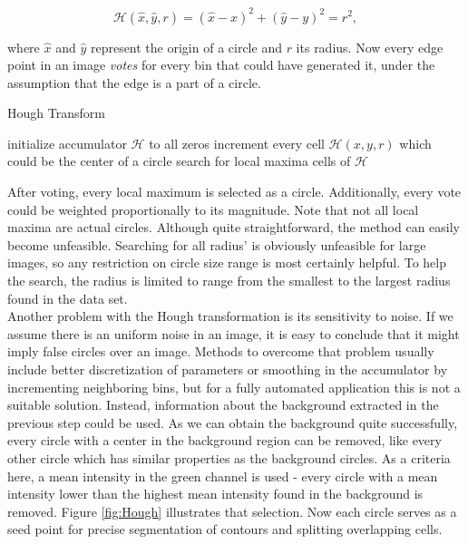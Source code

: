 \begin{equation}
	\mathcal{H}(\hat{x}, \hat{y}, r) = (\hat{x} - x)^2 + (\hat{y} - y)^2 = r^2,
\end{equation}

where  $\hat{x}$ and $\hat{y}$ represent the origin of a circle and $r$ its radius. Now every edge point in an image \textit{votes} for every bin that could have generated it, under the assumption that the edge is a part of a circle. \\

\begin{algorithm}
	\caption{Hough Transform}
 	\label{alg:Hough}
 	\begin{algorithmic}[1]
 		\State initialize accumulator $\mathcal{H}$ to all zeros
 			\State increment every cell $\mathcal{H}(x,y,r)$ which could be the center of a circle
 		\EndFor
 		\State search for local maxima cells of $\mathcal{H}$
 	\EndFunction
\end{algorithmic}
\end{algorithm}

After voting, every local maximum is selected as a circle. Additionally, every vote could be weighted proportionally to its magnitude. Note that not all local maxima are actual circles. Although quite straightforward, the method can easily become unfeasible. Searching for all radius' is obviously unfeasible for large images, so any restriction on circle size range is most certainly helpful. To help the search, the radius is limited to range from the smallest to the largest radius found in the data set. \\

Another problem with the Hough transformation is its sensitivity to noise. If we assume there is an uniform noise in an image, it is easy to conclude that it might imply false circles over an image. Methods to overcome that problem usually include better discretization of parameters or smoothing in the accumulator by incrementing neighboring bins, but for a fully automated application this is not a suitable solution. Instead, information about the background extracted in the previous step could be used. As we can obtain the background quite successfully, every circle with a center in the background region can be removed, like every other circle which has similar properties as the background circles. As a criteria here, a mean intensity in the green channel is used - every circle with a mean intensity lower than the highest mean intensity found in the background is removed. Figure \ref{fig:Hough} illustrates that selection. Now each circle serves as a seed point for precise segmentation of contours and splitting overlapping cells.

